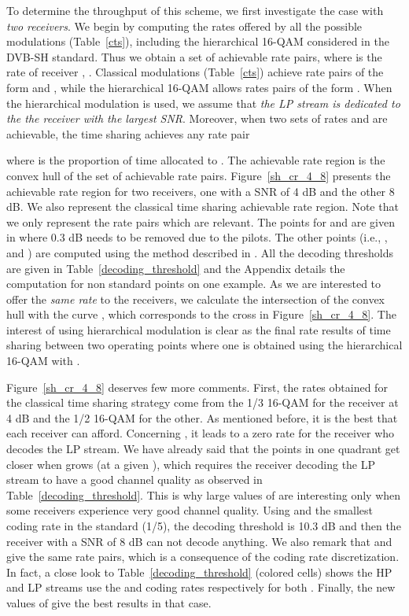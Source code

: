 \documentclass[conference, letterpaper]{IEEEtran}
\begin{document}
To determine the throughput of this scheme, we first investigate the case with \emph{two receivers}. We begin by computing the rates offered by all the possible modulations (Table~\ref{cts}), including the hierarchical 16-QAM considered in the DVB-SH standard. Thus we obtain a set of achievable  rate pairs, where  is the rate of receiver , . Classical modulations (Table~\ref{cts}) achieve rate pairs of the form  and , while the hierarchical 16-QAM allows rates pairs of the form . When the hierarchical modulation is used, we assume that \emph{the LP stream is dedicated to the the receiver with the largest SNR}. Moreover, when two sets of rates  and  are achievable, the time sharing achieves any rate pair 


\noindent where  is the proportion of time allocated to . The achievable rate region is the convex hull of the set of achievable  rate pairs. Figure~\ref{sh_cr_4_8} presents the achievable rate region for two receivers, one with a SNR of 4 dB and the other 8 dB. We also represent the classical time sharing achievable rate region. Note that we only represent the rate pairs which are relevant. The points for  and  are given in \cite[Table 7.11]{sh} where 0.3 dB needs to be removed due to the pilots. The other points (i.e., ,  and ) are computed using the method described in \cite{wts}. All the decoding thresholds are given in Table~\ref{decoding_threshold} and the Appendix details the computation for non standard points on one example. As we are interested to offer the \emph{same rate} to the receivers, we calculate the intersection of the convex hull with the curve , which corresponds to the cross in Figure~\ref{sh_cr_4_8}. The interest of using hierarchical modulation is clear as the final rate results of time sharing between two operating points where one is obtained using the hierarchical 16-QAM with .

Figure~\ref{sh_cr_4_8} deserves few more comments. First, the rates obtained for the classical time sharing strategy come from the 1/3 16-QAM for the receiver at 4 dB and the 1/2 16-QAM for the other. As mentioned before, it is the best that each receiver can afford. Concerning , it leads to a zero rate for the receiver who decodes the LP stream. We have already said that the points in one quadrant get closer when  grows (at a given ), which requires the receiver decoding the LP stream to have a good channel quality as observed in Table~\ref{decoding_threshold}. This is why large values of  are interesting only when some receivers experience very good channel quality. Using  and the smallest coding rate in the standard (1/5), the decoding threshold is 10.3 dB and then the receiver with a SNR of 8 dB can not decode anything. We also remark that  and  give the same rate pairs, which is a consequence of the coding rate discretization. In fact, a close look to Table~\ref{decoding_threshold} (colored cells) shows the HP and LP streams use the  and   coding rates respectively for both . Finally, the new values of  give the best results in that case.
\end{document}
